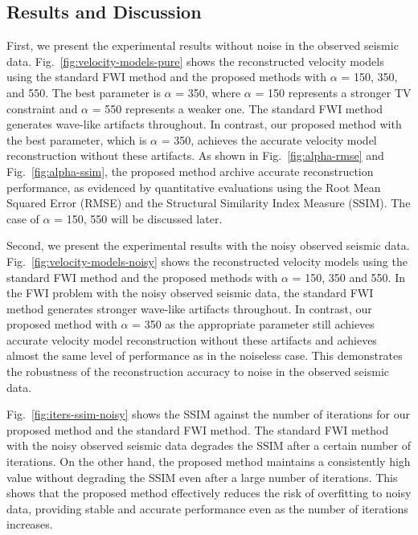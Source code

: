 \subsection{Results and Discussion} \label{subsec:results-and-discussion}
First, we present the experimental results without noise in the observed seismic data.
Fig.~\ref{fig:velocity-models-pure} shows the reconstructed velocity models using the standard FWI method and the proposed methods with $\alpha$ = 150, 350, and 550.
The best parameter is $\alpha$ = 350, where $\alpha$ = 150 represents a stronger TV constraint and $\alpha$ = 550 represents a weaker one.
The standard FWI method generates wave-like artifacts throughout.
In contrast, our proposed method with the best parameter, which is $\alpha$ = 350, achieves the accurate velocity model reconstruction without these artifacts.
As shown in Fig.~\ref{fig:alpha-rmse} and Fig.~\ref{fig:alpha-ssim}, the proposed method archive accurate reconstruction performance, as evidenced by quantitative evaluations using the Root Mean Squared Error (RMSE) and the Structural Similarity Index Measure (SSIM).
The case of $\alpha$ = 150, 550 will be discussed later.


Second, we present the experimental results with the noisy observed seismic data.
Fig.~\ref{fig:velocity-models-noisy} shows the reconstructed velocity models using the standard FWI method and the proposed methods with $\alpha$ = 150, 350 and 550.
In the FWI problem with the noisy observed seismic data, the standard FWI method generates stronger wave-like artifacts throughout.
In contrast, our proposed method with $\alpha$ = 350 as the appropriate parameter still achieves accurate velocity model reconstruction without these artifacts and achieves almost the same level of performance as in the noiseless case.
This demonstrates the robustness of the reconstruction accuracy to noise in the observed seismic data.

Fig.~\ref{fig:iters-ssim-noisy} shows the SSIM against the number of iterations for our proposed method and the standard FWI method.
The standard FWI method with the noisy observed seismic data degrades the SSIM after a certain number of iterations.
On the other hand, the proposed method maintains a consistently high value without degrading the SSIM even after a large number of iterations.
This shows that the proposed method effectively reduces the risk of overfitting to noisy data, providing stable and accurate performance even as the number of iterations increases.

